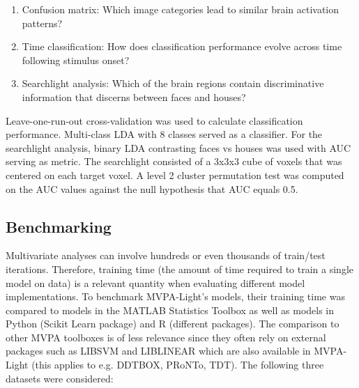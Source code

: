 \documentclass[utf8]{frontiersSCNS} %
\begin{document}
\begin{enumerate}
    \item Confusion matrix: Which image categories lead to similar brain activation patterns?
    \item Time classification: How does classification performance evolve across time following stimulus onset?
    \item Searchlight analysis: Which of the brain regions contain discriminative information that discerns between faces and houses?
\end{enumerate}

 Leave-one-run-out cross-validation was used to calculate classification performance. Multi-class LDA with 8 classes served as a classifier. For the searchlight analysis, binary LDA contrasting faces vs houses was used with AUC serving as metric. The searchlight consisted of a 3x3x3 cube of voxels that was centered on each target voxel. A level 2 cluster permutation test was computed on the AUC values against the null hypothesis that AUC equals 0.5.

\subsection{Benchmarking}

Multivariate analyses can involve hundreds or even thousands of train/test iterations. Therefore, training time (the amount of time required to train a single model on data) is a relevant quantity when evaluating different model implementations. To benchmark MVPA-Light's models, their training time was compared to models in the MATLAB Statistics Toolbox as well as models in Python (Scikit Learn package) and R (different packages). The comparison to other MVPA toolboxes is of less relevance since they often rely on external packages such as LIBSVM and LIBLINEAR which are also available in MVPA-Light (this applies to e.g. DDTBOX, PRoNTo, TDT). The following three datasets were considered:

\end{document}
